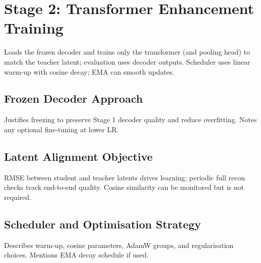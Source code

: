 
\section{Stage 2: Transformer Enhancement Training}

Loads the frozen decoder and trains only the transformer (and pooling head) to match the teacher latent; evaluation uses decoder outputs. Scheduler uses linear warm-up with cosine decay; EMA can smooth updates.


\subsection{Frozen Decoder Approach}

Justifies freezing to preserve Stage 1 decoder quality and reduce overfitting. Notes any optional fine-tuning at lower LR.


\subsection{Latent Alignment Objective}

RMSE between student and teacher latents drives learning; periodic full recon checks track end-to-end quality. Cosine similarity can be monitored but is not required.


\subsection{Scheduler and Optimisation Strategy}

Describes warm-up, cosine parameters, AdamW groups, and regularisation choices. Mentions EMA decay schedule if used.

